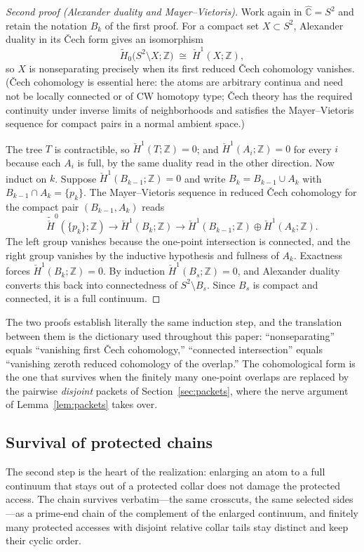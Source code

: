 \documentclass[11pt,reqno]{amsart}
\theoremstyle{definition}
\theoremstyle{remark}
\newcommand{\Z}{\mathbb Z}
\newcommand{\Chat}{\widehat{\mathbb C}}
\begin{document}
\begin{proof}[Second proof (Alexander duality and Mayer--Vietoris)]
Work again in $\Chat=S^2$ and retain the notation $B_k$ of the first
proof.  For a compact set $X\subset S^2$, Alexander duality in its
\v{C}ech form \cite[Chapter~6]{Spa66} gives an isomorphism
\[
\widetilde H_0\bigl(S^2\setminus X;\Z\bigr)\;\cong\;\check H^1(X;\Z),
\]
so $X$ is nonseparating precisely when its first reduced \v{C}ech
cohomology vanishes.  (\v{C}ech cohomology is essential here: the atoms
are arbitrary continua and need not be locally connected or of CW
homotopy type; \v{C}ech theory has the required
continuity under inverse limits of neighborhoods and satisfies the
Mayer--Vietoris sequence for compact pairs in a normal ambient space.)

The tree $T$ is contractible, so $\check H^1(T;\Z)=0$; and
$\check H^1(A_i;\Z)=0$ for every $i$ because each $A_i$ is full, by the
same duality read in the other direction.  Now induct on $k$.  Suppose
$\check H^1(B_{k-1};\Z)=0$ and write $B_k=B_{k-1}\cup A_k$ with
$B_{k-1}\cap A_k=\{p_k\}$.  The Mayer--Vietoris sequence in reduced
\v{C}ech cohomology for the compact pair $(B_{k-1},A_k)$ reads
\[
\widetilde{\check H}^0(\{p_k\};\Z)
\longrightarrow
\check H^1(B_k;\Z)
\longrightarrow
\check H^1(B_{k-1};\Z)\oplus\check H^1(A_k;\Z).
\]
The left group vanishes because the one-point intersection is connected,
and the right group vanishes by the inductive hypothesis and fullness of
$A_k$.  Exactness forces $\check H^1(B_k;\Z)=0$.  By induction
$\check H^1(B_s;\Z)=0$, and Alexander duality converts this back into
connectedness of $S^2\setminus B_s$.  Since $B_s$ is compact and
connected, it is a full continuum.
\end{proof}

The two proofs establish literally the same induction step, and the
translation between them is the dictionary used throughout this paper:
``nonseparating'' equals ``vanishing first \v{C}ech cohomology,''
``connected intersection'' equals ``vanishing zeroth reduced cohomology of
the overlap.''  The cohomological form is the one that survives when the
finitely many one-point overlaps are replaced by the pairwise
\emph{disjoint} packets of Section~\ref{sec:packets}, where the nerve
argument of Lemma~\ref{lem:packets} takes over.

\subsection*{Survival of protected chains}
The second step is the heart of the realization: enlarging an atom to a
full continuum that stays out of a protected collar does not damage the
protected access.  The chain survives verbatim---the same crosscuts, the
same selected sides---as a prime-end chain of the complement of the
enlarged continuum, and finitely many protected accesses with disjoint
relative collar tails stay distinct and keep their cyclic order.
\end{document}
